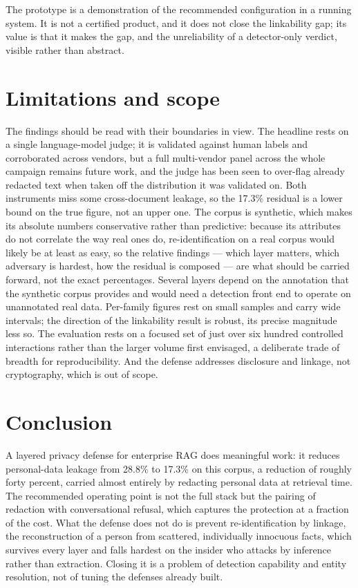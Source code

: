 \documentclass[11pt,a4paper]{article}
\begin{document}
The prototype is a demonstration of the recommended configuration in a running system. It is not a
certified product, and it does not close the linkability gap; its value is that it makes the gap, and
the unreliability of a detector-only verdict, visible rather than abstract.

\section{Limitations and scope}

The findings should be read with their boundaries in view. The headline rests on a single language-model
judge; it is validated against human labels and corroborated across vendors, but a full multi-vendor
panel across the whole campaign remains future work, and the judge has been seen to over-flag already
redacted text when taken off the distribution it was validated on. Both instruments miss some
cross-document leakage, so the 17.3\% residual is a lower bound on the true figure, not an upper one.
The corpus is synthetic, which makes its absolute numbers conservative rather than predictive: because
its attributes do not correlate the way real ones do, re-identification on a real corpus would likely be
at least as easy, so the relative findings --- which layer matters, which adversary is hardest, how the
residual is composed --- are what should be carried forward, not the exact percentages. Several layers
depend on the annotation that the synthetic corpus provides and would need a detection front end to
operate on unannotated real data. Per-family figures rest on small samples and carry wide intervals; the
direction of the linkability result is robust, its precise magnitude less so. The evaluation rests on a
focused set of just over six hundred controlled interactions rather than the larger volume first
envisaged, a deliberate trade of breadth for reproducibility. And the defense addresses disclosure and
linkage, not cryptography, which is out of scope.

\section{Conclusion}

A layered privacy defense for enterprise RAG does meaningful work: it reduces personal-data leakage from
28.8\% to 17.3\% on this corpus, a reduction of roughly forty percent, carried almost entirely by
redacting personal data at retrieval time. The recommended operating point is not the full stack but the
pairing of redaction with conversational refusal, which captures the protection at a fraction of the
cost. What the defense does not do is prevent re-identification by linkage, the reconstruction of a
person from scattered, individually innocuous facts, which survives every layer and falls hardest on the
insider who attacks by inference rather than extraction. Closing it is a problem of detection capability
and entity resolution, not of tuning the defenses already built.
\end{document}
